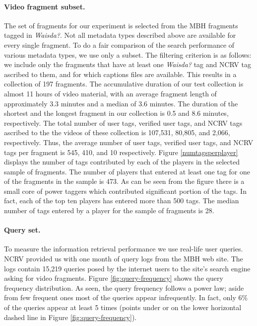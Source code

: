 \paragraph{\textbf{Video fragment subset.}}
\label{sec:fragment-collection}
The set of fragments for our experiment is selected from the MBH fragments tagged in \textit{Waisda?}. Not all metadata types described above are available for every single fragment. To do a fair comparison of the search performance of various metadata types, we use only a subset. The filtering criterion is as follows: we include only the fragments that have at least one \textit{Waisda?} tag and NCRV tag ascribed to them, and for which captions files are available. This results in a collection of 197 fragments. The accumulative duration of our test collection is almost 11 hours of video material, with an average fragment length of approximately 3.3 minutes and a median of 3.6 minutes. The duration of the shortest and the longest fragment in our collection is 0.5 and 8.6 minutes, respectively. The total number of user tags, verified user tags, and NCRV tags ascribed to the the videos of these collection is 107,531, 80,805, and 2,066, respectively. Thus, the average number of user tags, verified user tags, and NCRV tags per fragment is 545, 410, and 10 respectively. Figure \ref{numtagsperplayer} displays the number of tags contributed by each of the players in the selected sample of fragments. The number of players that entered at least one tag for one of the fragments in the sample is 473. As can be seen from the figure there is a small core of power taggers which contributed significant portion of the tags. In fact, each of the top ten players has entered more than 500 tags. The median number of tags entered by a player for the sample of fragments is 28.

\paragraph{\textbf{Query set.}}\label{ecir-sec:query-set}
To measure the information retrieval performance we use real-life user queries. NCRV provided us with one month of query logs from the MBH web site. The logs contain 15,219 queries posed by the internet users to the site's search engine asking for video fragments. Figure \ref{fig:query-frequency} shows the query frequency distribution. As seen, the query frequency follows a power law; aside from few frequent ones most of the queries appear infrequently. In fact, only 6\% of the queries appear at least 5 times (points under or on the lower horizontal dashed line in Figure \ref{fig:query-frequency}).

